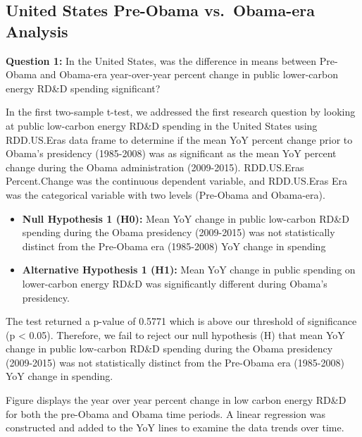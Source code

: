 \documentclass[
  12pt,
]{article}
\begin{document}
\hypertarget{united-states-pre-obama-vs.-obama-era-analysis}{%
\subsection{United States Pre-Obama vs.~Obama-era
Analysis}\label{united-states-pre-obama-vs.-obama-era-analysis}}

\textbf{Question 1:} In the United States, was the difference in means
between Pre-Obama and Obama-era year-over-year percent change in public
lower-carbon energy RD\&D spending significant?

In the first two-sample t-test, we addressed the first research question
by looking at public low-carbon energy RD\&D spending in the United
States using RDD.US.Eras data frame to determine if the mean YoY percent
change prior to Obama's presidency (1985-2008) was as significant as the
mean YoY percent change during the Obama administration (2009-2015).
RDD.US.Eras Percent.Change was the continuous dependent variable, and
RDD.US.Eras Era was the categorical variable with two levels (Pre-Obama
and Obama-era).

\begin{itemize}
\item
  \textbf{Null Hypothesis 1 (H0):} Mean YoY change in public low-carbon
  RD\&D spending during the Obama presidency (2009-2015) was not
  statistically distinct from the Pre-Obama era (1985-2008) YoY change
  in spending
\item
  \textbf{Alternative Hypothesis 1 (H1):} Mean YoY change in public
  spending on lower-carbon energy RD\&D was significantly different
  during Obama's presidency.
\end{itemize}

The test returned a p-value of 0.5771 which is above our threshold of
significance (p \textless{} 0.05). Therefore, we fail to reject our null
hypothesis (H) that mean YoY change in public low-carbon RD\&D spending
during the Obama presidency (2009-2015) was not statistically distinct
from the Pre-Obama era (1985-2008) YoY change in spending.

Figure displays the year over year percent change in low carbon energy
RD\&D for both the pre-Obama and Obama time periods. A linear regression
was constructed and added to the YoY lines to examine the data trends
over time.
\end{document}
